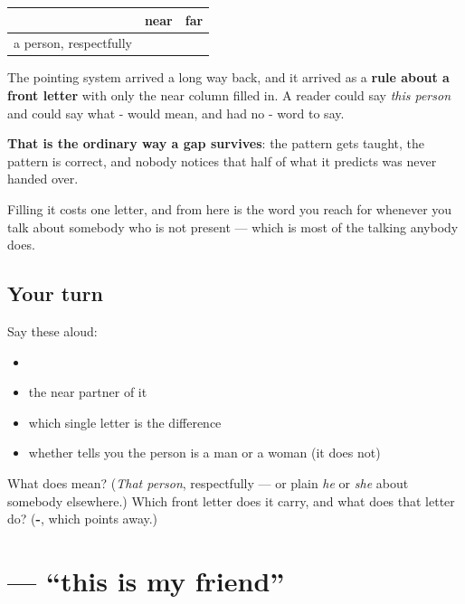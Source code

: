 \begin{grammarlens}[title={Grammar Lens: the column that was empty}]
\noindent
\begin{tabularx}{\linewidth}{@{}>{\raggedright\arraybackslash}X>{\raggedright\arraybackslash}X>{\raggedright\arraybackslash}X@{}}
\toprule
\textbf{} & \textbf{near} & \textbf{far} \\
\midrule
a person, respectfully & \ta{இவர்} & \ta{அவர்} \\
\bottomrule
\end{tabularx}

The pointing system arrived a long way back, and it arrived as a \textbf{rule about a front letter} with only the near column filled in. A reader could say \emph{this person} and could say what - would mean, and had no - word to say.

\textbf{That is the ordinary way a gap survives}: the pattern gets taught, the pattern is correct, and nobody notices that half of what it predicts was never handed over.

Filling it costs one letter, and from here \textbf{} is the word you reach for whenever you talk about somebody who is not present — which is most of the talking anybody does.
\end{grammarlens}

\subsection*{Your turn}
Say these aloud:

\begin{itemize}
\raggedright
  \item {}
  \item the near partner of it
  \item which single letter is the difference
  \item whether  tells you the person is a man or a woman (it does not)
\end{itemize}

\begin{tcolorbox}[breakable,colback=teal!4,colframe=teal!35!black,title={Before you move on}]
What does  mean? (\emph{That person}, respectfully — or plain \emph{he} or \emph{she} about somebody elsewhere.) Which front letter does it carry, and what does that letter do? (\textbf{-}, which points away.)
\end{tcolorbox}
\section[\texorpdfstring{\ta{இவர்} \ta{என்} \ta{நண்பர்} (ivar eṉ naṇbar)}{இவர் என் நண்பர் (ivar eṉ naṇbar)}]{   — \textquotedblleft{}this is my friend\textquotedblright{}}

